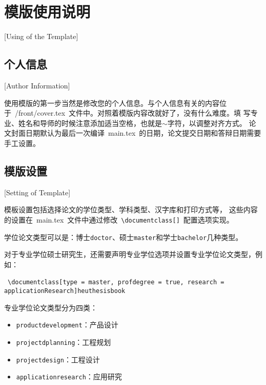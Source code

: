 
%
%
%

\chapter{模版使用说明}[Using of the Template]
\label{chap03}

\section{个人信息}[Author Information]

使用模版的第一步当然是修改您的个人信息。与个人信息有关的内容位
于~{/front/cover.tex}~文件中。对照着模版内容改就好了，没有什么难度。填
写专业、姓名和导师的时候注意添加适当空格，也就是$\sim$字符，以调整对齐方式。
论文封面日期默认为最后一次编译~main.tex~的日期，论文提交日期和答辩日期需要手工设置。

\section{模版设置}[Setting of Template]

模板设置包括选择论文的学位类型、学科类型、汉字库和打印方式等，
这些内容的设置在~main.tex~文件中通过修改~\texttt{\textbackslash documentclass[]}~配置选项实现。

学位论文类型可以是：博士\texttt{doctor}、硕士\texttt{master}和学士\texttt{bachelor}几种类型。

对于专业学位硕士研究生，还需要声明专业学位选项并设置专业学位论文类型，例如：

~\texttt{\textbackslash documentclass[type = master, profdegree = true, research = applicationResearch]{heuthesisbook}}

专业学位论文类型分为四类：
\begin{itemize}
  \item \texttt{productdevelopment}：产品设计
  \item \texttt{projectdplanning}：工程规划
  \item \texttt{projectdesign}：工程设计
  \item \texttt{applicationresearch}：应用研究
\end{itemize}

